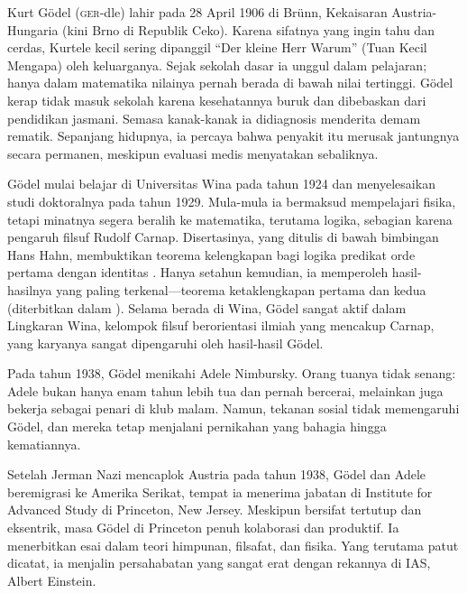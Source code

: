 \documentclass[../../../include/open-logic-section]{subfiles}
\begin{document}



Kurt G{\"o}del (\textsc{ger}-dle) lahir pada 28 April 1906 di Br{\"u}nn,
Kekaisaran Austria-Hungaria (kini Brno di Republik Ceko). Karena sifatnya
yang ingin tahu dan cerdas, Kurtele kecil sering dipanggil ``Der kleine Herr
Warum'' (Tuan Kecil Mengapa) oleh keluarganya. Sejak sekolah dasar ia unggul
dalam pelajaran; hanya dalam matematika nilainya pernah berada di bawah
nilai tertinggi. G{\"o}del kerap tidak masuk sekolah karena kesehatannya
buruk dan dibebaskan dari pendidikan jasmani. Semasa kanak-kanak ia
didiagnosis menderita demam rematik. Sepanjang hidupnya, ia percaya bahwa
penyakit itu merusak jantungnya secara permanen, meskipun evaluasi medis
menyatakan sebaliknya.

G{\"o}del mulai belajar di Universitas Wina pada tahun 1924 dan menyelesaikan
studi doktoralnya pada tahun 1929. Mula-mula ia bermaksud mempelajari fisika,
tetapi minatnya segera beralih ke matematika, terutama logika, sebagian
karena pengaruh filsuf Rudolf Carnap. Disertasinya, yang ditulis di bawah
bimbingan Hans Hahn, membuktikan teorema kelengkapan bagi logika predikat
orde pertama dengan identitas \citep{Godel1929}. Hanya setahun kemudian, ia
memperoleh hasil-hasilnya yang paling terkenal---teorema ketaklengkapan
pertama dan kedua (diterbitkan dalam \citealt{Godel1931}). Selama berada di
Wina, G{\"o}del sangat aktif dalam Lingkaran Wina, kelompok filsuf
berorientasi ilmiah yang mencakup Carnap, yang karyanya sangat dipengaruhi
oleh hasil-hasil G{\"o}del.

Pada tahun 1938, G\"odel menikahi Adele Nimbursky. Orang tuanya tidak senang:
Adele bukan hanya enam tahun lebih tua dan pernah bercerai, melainkan juga
bekerja sebagai penari di klub malam. Namun, tekanan sosial tidak
memengaruhi G{\"o}del, dan mereka tetap menjalani pernikahan yang bahagia
hingga kematiannya.

Setelah Jerman Nazi mencaplok Austria pada tahun 1938, G{\"o}del dan Adele
beremigrasi ke Amerika Serikat, tempat ia menerima jabatan di Institute for
Advanced Study di Princeton, New Jersey. Meskipun bersifat tertutup dan
eksentrik, masa G{\"o}del di Princeton penuh kolaborasi dan produktif. Ia
menerbitkan esai dalam teori himpunan, filsafat, dan fisika. Yang terutama
patut dicatat, ia menjalin persahabatan yang sangat erat dengan rekannya di
IAS, Albert Einstein.
\end{document}
